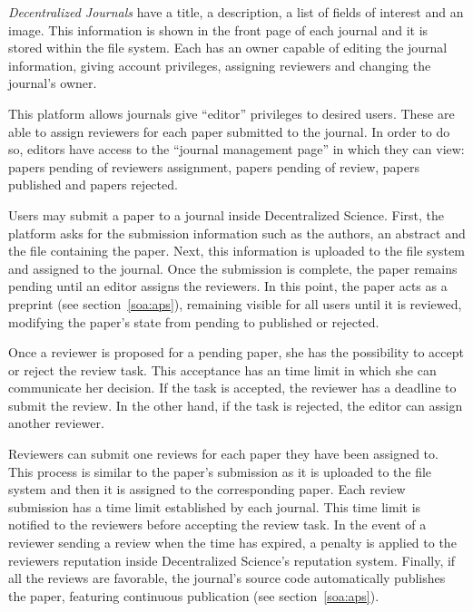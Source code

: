 \emph{Decentralized Journals} have a title, a description, a list of fields of
interest and an image. This information is shown in the front page of each
journal and it is stored within the file system. Each 
has an owner capable of editing the journal information, giving account
privileges, assigning reviewers and changing the journal's owner.

\label{cha:platform-description-5}

This platform allows journals give ``editor'' privileges to desired users. These
are able to assign reviewers for each paper submitted to the journal. In order
to do so, editors have access to the ``journal management page'' in which they
can view: papers pending of reviewers assignment, papers pending of review,
papers published and papers rejected.

\label{cha:platform-description-4}

Users may submit a paper to a journal inside Decentralized Science. First, the
platform asks for the submission information such as the authors, an abstract
and the file containing the paper. Next, this information is uploaded to the
file system and assigned to the journal. Once the submission is complete, the
paper remains pending until an editor assigns the reviewers. In this point, the
paper acts as a preprint (see section~\ref{soa:aps}), remaining visible for all
users until it is reviewed, modifying the paper's state from pending to
published or rejected.

\label{cha:platform-description-3}

Once a reviewer is proposed for a pending paper, she has the possibility to
accept or reject the review task. This acceptance has an time limit in which she
can communicate her decision. If the task is accepted, the reviewer has a
deadline to submit the review. In the other hand, if the task is rejected, the
editor can assign another reviewer.

\label{cha:platform-description-2}

Reviewers can submit one reviews for each paper they have been assigned to. This
process is similar to the paper's submission as it is uploaded to the file
system and then it is assigned to the corresponding paper. Each review
submission has a time limit established by each journal. This time limit is
notified to the reviewers before accepting the review task. In the event of a
reviewer sending a review when the time has expired, a penalty is applied to the
reviewers reputation inside Decentralized Science's reputation system. Finally,
if all the reviews are favorable, the journal's source code automatically
publishes the paper, featuring continuous publication (see
section~\ref{soa:aps}).


